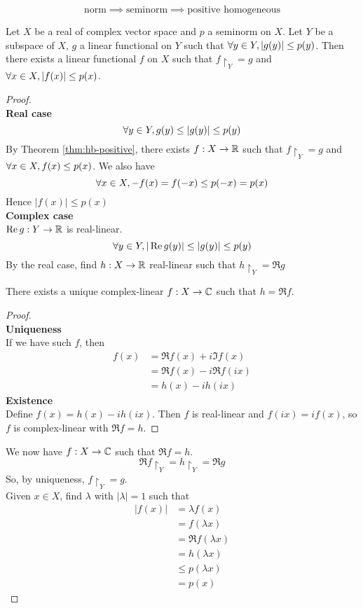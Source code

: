 \documentclass{article}
\begin{document}
\begin{rmk}
  $$\text{norm} \implies \text{seminorm} \implies \text{positive homogeneous}$$
\end{rmk}

\newlec

\begin{nthm}\label{thm:hb-absolute}
  Let $X$ be a real of complex vector space and $p$ a seminorm on $X$. Let $Y$ be a subspace of $X$, $g$ a linear functional on $Y$ such that $\forall y \in Y, |g(y)| \le p(y)$. Then there exists a linear functional $f$ on $X$ such that $f\restriction_Y = g$ and $\forall x \in X, |f(x)| \le p(x)$.
\end{nthm}
\begin{proof}~\\
  {\bf Real case}
  $$\forall y \in Y, g(y) \le |g(y)| \le p(y)$$
  By Theorem \ref{thm:hb-positive}, there exists $f : X \rightarrow \mathbb R$ such that $f\restriction_Y = g$ and $\forall x \in X, f(x) \le p(x)$. We also have
  $$\forall x \in X, -f(x) = f(-x) \le p(-x) = p(x)$$
  Hence $|f(x)| \le p(x)$ \\
  {\bf Complex case} \\
  $\operatorname{Re} g : Y \rightarrow \mathbb R$ is real-linear.
  $$\forall y \in Y, |\operatorname{Re} g(y)| \le |g(y)| \le p(y)$$
  By the real case, find $h : X \rightarrow \mathbb R$ real-linear such that $h\restriction_Y = \Re g$
  \begin{claim}
    There exists a unique complex-linear $f : X \rightarrow \mathbb C$ such that $h = \Re f$.
  \end{claim}
  \begin{proof}~\\
    {\bf Uniqueness} \\
    If we have such $f$, then
    \begin{align*}
      f(x)
      & = \Re f(x) + i\Im f(x) \\
      & = \Re f(x) - i\Re f(ix) \\
      & = h(x) - ih(ix)
    \end{align*}
    {\bf Existence} \\
    Define $f(x) = h(x) - ih(ix)$. Then $f$ is real-linear and $f(ix) = if(x)$, so $f$ is complex-linear with $\Re f = h$.
  \end{proof}
  We now have $f : X \rightarrow \mathbb C$ such that $\Re f = h$.
  $$\Re f\restriction_Y = h\restriction_Y = \Re g$$
  So, by uniqueness, $f\restriction_Y = g$. \\
  Given $x \in X$, find $\lambda$ with $|\lambda| = 1$ such that
  \begin{align*}
    |f(x)|
    & = \lambda f(x) \\
    & = f(\lambda x) \\
    & = \Re f(\lambda x) \\
    & = h(\lambda x) \\
    & \le p(\lambda x) \\
    & = p(x)
  \end{align*}
\end{proof}
\end{document}

